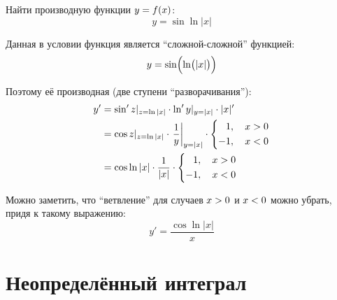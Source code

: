 \documentclass[a4paper,12pt]{article}
\begin{document}
  Найти производную функции $y \hm= f(x)$:
  \[
    y = \sin \ln |x|
  \]
  
  \begin{solution}
    Данная в условии функция является ``сложной-сложной'' функцией:
    \[
      y = \sin\Bigl( \ln\bigl( |x| \bigr) \Bigr)
    \]
    
    Поэтому её производная (две ступени ``разворачивания''):
    \begin{equation*}
    \begin{split}
      y' &= \sin'{z}|_{z = \ln |x|} \cdot \ln'{y}|_{y = |x|} \cdot |x|'\\
      &= \cos{z}|_{z = \ln |x|} \cdot \left.\frac{1}{y}\right|_{y = |x|} \cdot \left\{
        \begin{aligned}
          &\hphantom{{+}}1,\quad x > 0\\
          &{-}1,\quad x < 0
        \end{aligned}
      \right.\\  %
      &= \cos \ln |x| \cdot \frac{1}{|x|} \cdot \left\{
        \begin{aligned}
          &\hphantom{{+}}1,\quad x > 0\\
          &{-}1,\quad x < 0
        \end{aligned}
      \right.
    \end{split}
    \end{equation*}
    
    Можно заметить, что ``ветвление'' для случаев $x \hm> 0$ и $x \hm< 0$ можно убрать, придя к такому выражению:
    \[
      y' = \frac{\cos \ln |x|}{x}
    \]
  \end{solution}
  
  
  
  
  
  
  \section{Неопределённый интеграл}
  
\end{document}
